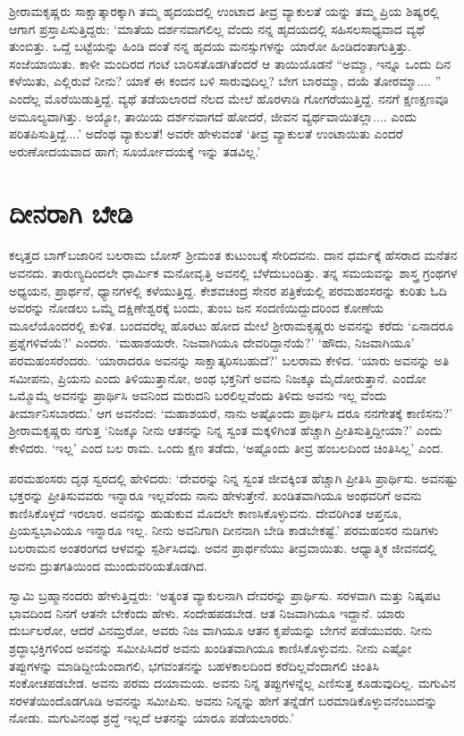 ಶ‍್ರೀರಾಮಕೃಷ್ಣರು ಸಾಕ್ಷಾತ್ಕಾರಕ್ಕಾಗಿ ತಮ್ಮ ಹೃದಯದಲ್ಲಿ ಉಂಟಾದ ತೀವ್ರ ವ್ಯಾಕುಲತೆ ಯನ್ನು ತಮ್ಮ ಪ್ರಿಯ ಶಿಷ್ಯರಲ್ಲಿ ಆಗಾಗ ಪ್ರಸ್ತಾಪಿಸುತ್ತಿದ್ದರು: ‘ಮಾತೆಯ ದರ್ಶನವಾಗಲಿಲ್ಲ ವೆಂದು ನನ್ನ ಹೃದಯದಲ್ಲಿ ಸಹಿಸಲಸಾಧ್ಯವಾದ ವ್ಯಥೆ ತುಂಬಿತ್ತು. ಒದ್ದೆ ಬಟ್ಟೆಯನ್ನು ಹಿಂಡಿ ದಂತೆ ನನ್ನ ಹೃದಯ ಮನಸ್ಸುಗಳನ್ನು ಯಾರೋ ಹಿಂಡಿದಂತಾಗುತ್ತಿತ್ತು. ಸಂಜೆಯಾಯಿತು. ಕಾಳೀ ಮಂದಿರದ ಗಂಟೆ ಬಾರಿಸತೊಡಗಿತೆಂದರೆ ಆ ತಾಯಿಯೊಡನೆ “ಅಮ್ಮಾ, ಇನ್ನೂ ಒಂದು ದಿನ ಕಳೆಯಿತು, ಎಲ್ಲಿರುವೆ ನೀನು? ಯಾಕೆ ಈ ಕಂದನ ಬಳಿ ಸಾರುವುದಿಲ್ಲ? ಬೇಗ ಬಾರಮ್ಮಾ, ದಯೆ ತೋರಮ್ಮಾ.... ” ಎಂದೆಲ್ಲ ಮೊರೆಯಿಡುತ್ತಿದ್ದೆ. ವ್ಯಥೆ ತಡೆಯಲಾರದೆ ನೆಲದ ಮೇಲೆ ಹೊರಳಾಡಿ ಗೋಗರೆಯುತ್ತಿದ್ದೆ. ನನಗೆ ಕ್ಷಣಕ್ಷಣವೂ ಅಮೂಲ್ಯವಾಗಿತ್ತು. ಅಯ್ಯೋ, ತಾಯಿಯ ದರ್ಶನವಾಗದೆ ಹೋದರೆ, ಜೀವನ ವ್ಯರ್ಥವಾಯಿತಲ್ಲಾ.... ಎಂದು ಪರಿತಪಿಸುತ್ತಿದ್ದೆ....’ ಅದೆಂಥ ವ್ಯಾಕುಲತೆ! ಅವರೇ ಹೇಳುವಂತೆ ‘ತೀವ್ರ ವ್ಯಾಕುಲತೆ ಉಂಟಾಯಿತು ಎಂದರೆ ಅರುಣೋದಯವಾದ ಹಾಗೆ; ಸೂರ್ಯೋದಯಕ್ಕೆ ಇನ್ನು ತಡವಿಲ್ಲ.’


\section{ದೀನರಾಗಿ ಬೇಡಿ}

ಕಲ್ಕತ್ತದ ಬಾಗ್​ಬಜಾರಿನ ಬಲರಾಮ ಬೋಸ್ ಶ‍್ರೀಮಂತ ಕುಟುಂಬಕ್ಕೆ ಸೇರಿದವನು. ದಾನ ಧರ್ಮಕ್ಕೆ ಹೆಸರಾದ ಮನೆತನ ಅವನದು. ತಾರುಣ್ಯದಿಂದಲೇ ಧಾರ್ಮಿಕ ಮನೋವೃತ್ತಿ ಅವನಲ್ಲಿ ಬೆಳೆದುಬಂದಿತ್ತು. ತನ್ನ ಸಮಯವನ್ನು ಶಾಸ್ತ್ರ ಗ್ರಂಥಗಳ ಅಧ್ಯಯನ, ಪ್ರಾರ್ಥನೆ, ಧ್ಯಾನಗಳಲ್ಲಿ ಕಳೆಯುತ್ತಿದ್ದ. ಕೇಶವಚಂದ್ರ ಸೇನರ ಪತ್ರಿಕೆಯಲ್ಲಿ ಪರಮಹಂಸರನ್ನು ಕುರಿತು ಓದಿ ಅವರನ್ನು ನೋಡಲು ಒಮ್ಮೆ ದಕ್ಷಿಣೇಶ್ವರಕ್ಕೆ ಬಂದು, ತುಂಬ ಜನ ಸಂದಣಿಯಿದ್ದುದರಿಂದ ಕೋಣೆಯ ಮೂಲೆಯೊಂದರಲ್ಲಿ ಕುಳಿತ. ಬಂದವರೆಲ್ಲ ಹೊರಟು ಹೋದ ಮೇಲೆ ಶ‍್ರೀರಾಮಕೃಷ್ಣರು ಅವನನ್ನು ಕರೆದು ‘ಏನಾದರೂ ಪ್ರಶ್ನೆಗಳಿವೆಯೆ?’ ಎಂದರು. ‘ಮಹಾಶಯರೇ. ನಿಜವಾಗಿಯೂ ದೇವರಿದ್ದಾನೆಯೆ?’ ‘ಹೌದು, ನಿಜವಾಗಿಯೂ’ ಪರಮಹಂಸರೆಂದರು. ‘ಯಾರಾದರೂ ಅವನನ್ನು ಸಾಕ್ಷಾತ್ಕರಿಸಬಹುದೆ?’ ಬಲರಾಮ ಕೇಳಿದ. ‘ಯಾರು ಅವನನ್ನು ಅತಿ ಸಮೀಪನು, ಪ್ರಿಯನು ಎಂದು ತಿಳಿಯುತ್ತಾನೋ, ಅಂಥ ಭಕ್ತನಿಗೆ ಅವನು ನಿಜಕ್ಕೂ ಮೈದೋರುತ್ತಾನೆ. ಎಂದೋ ಒಮ್ಮೊಮ್ಮೆ ಅವನನ್ನು ಪ್ರಾರ್ಥಿಸಿ ಅವನಿಂದ ಮರುದನಿ ಬರಲಿಲ್ಲವೆಂದು ತಿಳಿದು ಅವನು ಇಲ್ಲ ವೆಂದು ತೀರ್ಮಾನಿಸಬಾರದು.’ ಆಗ ಅವನೆಂದ: ‘ಮಹಾಶಯರೆ, ನಾನು ಅಷ್ಟೊಂದು ಪ್ರಾರ್ಥಿಸಿ ದರೂ ನನಗೇತಕ್ಕೆ ಕಾಣಿಸನು?’ ಶ‍್ರೀರಾಮಕೃಷ್ಣರು ನಗುತ್ತ ‘ನಿಜಕ್ಕೂ ನೀನು ಆತನನ್ನು ನಿನ್ನ ಸ್ವಂತ ಮಕ್ಕಳಿಗಿಂತ ಹೆಚ್ಚಾಗಿ ಪ್ರೀತಿಸುತ್ತಿದ್ದೀಯಾ?’ ಎಂದು ಕೇಳಿದರು. ‘ಇಲ್ಲ’ ಎಂದ ಬಲ ರಾಮ. ಒಂದು ಕ್ಷಣ ತಡೆದು, ‘ಅಷ್ಟೊಂದು ತೀವ್ರ ಹಂಬಲದಿಂದ ಚಿಂತಿಸಿಲ್ಲ’ ಎಂದ.

ಪರಮಹಂಸರು ದೃಢ ಸ್ವರದಲ್ಲಿ ಹೇಳಿದರು: ‘ದೇವರನ್ನು ನಿನ್ನ ಸ್ವಂತ ಜೀವಕ್ಕಿಂತ ಹೆಚ್ಚಾಗಿ ಪ್ರೀತಿಸಿ ಪ್ರಾರ್ಥಿಸು. ಅವನಷ್ಟು ಭಕ್ತರನ್ನು ಪ್ರೀತಿಸುವವರು ಇನ್ನಾರೂ ಇಲ್ಲವೆಂದು ನಾನು ಹೇಳುತ್ತೇನೆ. ಖಂಡಿತವಾಗಿಯೂ ಅಂಥವರಿಗೆ ಅವನು ಕಾಣಿಸಿಕೊಳ್ಳದೆ ಇರಲಾರ. ಅವನನ್ನು ಹುಡುಕುವ ಮೊದಲೇ ಕಾಣಸಿಕೊಳ್ಳುವನು. ದೇವರಿಗಿಂತ ಆಪ್ತನೂ, ಪ್ರಿಯಸ್ವಭಾವಿಯೂ ಇನ್ನಾರೂ ಇಲ್ಲ. ನೀನು ಅವನಿಗಾಗಿ ದೀನನಾಗಿ ಬೇಡಿ ಕಾಡಬೇಕಷ್ಟೆ.’ ಪರಮಹಂಸರ ನುಡಿಗಳು ಬಲರಾಮನ ಅಂತರಂಗದ ಆಳವನ್ನು ಸ್ಪರ್ಶಿಸಿದವು. ಅವನ ಪ್ರಾರ್ಥನೆಯು ತೀವ್ರವಾಯಿತು. ಆಧ್ಯಾತ್ಮಿಕ ಜೀವನದಲ್ಲಿ ಅವನು ದ್ರುತಗತಿಯಿಂದ ಮುಂದುವರಿಯತೊಡಗಿದ.

ಸ್ವಾಮಿ ಬ್ರಹ್ಮಾನಂದರು ಹೇಳುತ್ತಿದ್ದರು: ‘ಅತ್ಯಂತ ವ್ಯಾಕುಲನಾಗಿ ದೇವರನ್ನು ಪ್ರಾರ್ಥಿಸು. ಸರಳವಾಗಿ ಮತ್ತು ನಿಷ್ಕಪಟ ಭಾವದಿಂದ ನಿನಗೆ ಆತನೇ ಬೇಕೆಂದು ಹೇಳು. ಸಂದೇಹಪಡಬೇಡ. ಆತ ನಿಜವಾಗಿಯೂ ಇದ್ದಾನೆ. ಯಾರು ದುರ್ಬಲರೋ, ಆದರೆ ವಿನಮ್ರರೋ, ಅವರು ನಿಜ ವಾಗಿಯೂ ಆತನ ಕೃಪೆಯನ್ನು ಬೇಗನೆ ಪಡೆಯುವರು. ನೀನು ಶ್ರದ್ಧಾಭಕ್ತಿಗಳಿಂದ ಅವನನ್ನು ಸಮೀಪಿಸಿದರೆ ಅವನು ಖಂಡಿತವಾಗಿಯೂ ಕಾಣಿಸಿಕೊಳ್ಳುವನು. ನೀನು ಎಷ್ಟೋ ತಪ್ಪುಗಳನ್ನು ಮಾಡಿದ್ದೀಯೆಂದಾಗಲಿ, ಭಗವಂತನನ್ನು ಬಹಳಕಾಲದಿಂದ ಕರೆದಿಲ್ಲವೆಂದಾಗಲಿ ಚಿಂತಿಸಿ ಸಂಕೋಚಪಡಬೇಡ. ಅವನು ಪರಮ ದಯಾಮಯ. ಅವನು ನಿನ್ನ ತಪ್ಪುಗಳನ್ನೆಲ್ಲ ಎಣಿಸುತ್ತ ಕೂಡುವುದಿಲ್ಲ. ಮಗುವಿನ ಸರಳತೆಯಿಂದೊಡಗೂಡಿ ಅವನನ್ನು ಸಮೀಪಿಸು. ಅವನು ನಿನ್ನನ್ನು ಹೇಗೆ ತನ್ನೆಡೆಗೆ ಬರಮಾಡಿಕೊಳ್ಳುವನೆಂಬುದನ್ನು ನೋಡು. ಮಗುವಿನಂಥ ಶ್ರದ್ಧೆ ಇಲ್ಲದೆ ಆತನನ್ನು ಯಾರೂ ಪಡೆಯಲಾರರು.’


